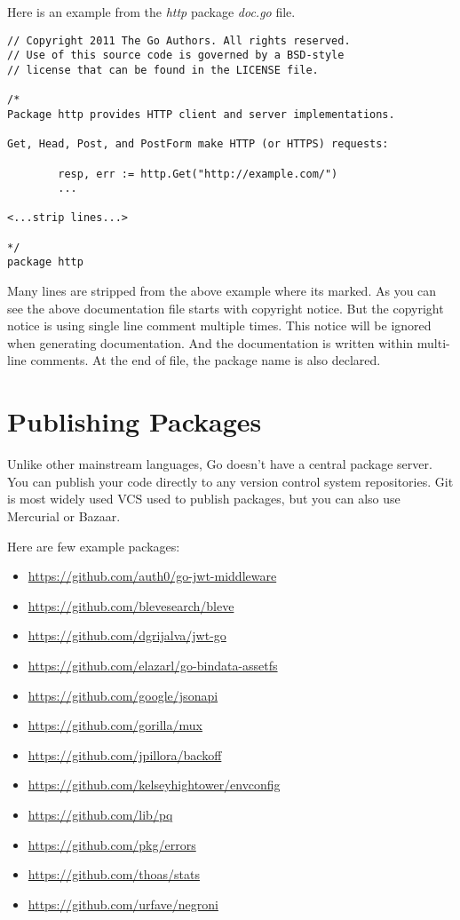 Here is an example from the \textit{http} package \textit{doc.go}
file.

\begin{lstlisting}[numbers=none]
// Copyright 2011 The Go Authors. All rights reserved.
// Use of this source code is governed by a BSD-style
// license that can be found in the LICENSE file.

/*
Package http provides HTTP client and server implementations.

Get, Head, Post, and PostForm make HTTP (or HTTPS) requests:

        resp, err := http.Get("http://example.com/")
        ...

<...strip lines...>

*/
package http
\end{lstlisting}

Many lines are stripped from the above example where its marked.  As
you can see the above documentation file starts with copyright notice.
But the copyright notice is using single line comment multiple times.
This notice will be ignored when generating documentation.  And the
documentation is written within multi-line comments.  At the end of
file, the package name is also declared.

\section{Publishing Packages}

Unlike other mainstream languages, Go doesn't have a central package
server.  You can publish your code directly to any version control
system repositories.  Git is most widely used
VCS used to publish packages, but you can also use Mercurial or
Bazaar.

Here are few example packages:

\begin{itemize}
\item \url{https://github.com/auth0/go-jwt-middleware}
\item \url{https://github.com/blevesearch/bleve}
\item \url{https://github.com/dgrijalva/jwt-go}
\item \url{https://github.com/elazarl/go-bindata-assetfs}
\item \url{https://github.com/google/jsonapi}
\item \url{https://github.com/gorilla/mux}
\item \url{https://github.com/jpillora/backoff}
\item \url{https://github.com/kelseyhightower/envconfig}
\item \url{https://github.com/lib/pq}
\item \url{https://github.com/pkg/errors}
\item \url{https://github.com/thoas/stats}
\item \url{https://github.com/urfave/negroni}
\end{itemize}


